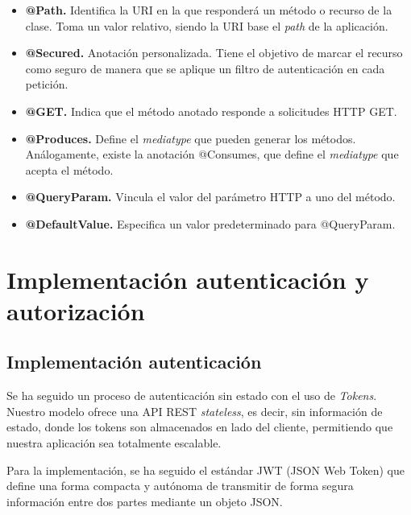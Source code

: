 \begin{itemize}
	\item \textbf{@Path. }Identifica la URI en la que responderá un método o recurso de la clase. Toma un valor relativo, siendo la URI base el \textit{path} de la aplicación.
	\item \textbf{@Secured. }Anotación personalizada. Tiene el objetivo de marcar el recurso como seguro de manera que se aplique un filtro de autenticación en cada petición.
	\item \textbf{@GET. }Indica que el método anotado responde a solicitudes HTTP GET.
	\item \textbf{@Produces. }Define el \textit{mediatype} que pueden generar los métodos. Análogamente, existe la anotación @Consumes, que define el \textit{mediatype} que acepta el método.
	\item \textbf{@QueryParam. }Vincula el valor del parámetro HTTP a uno del método.
	\item \textbf{@DefaultValue. }Especifica un valor predeterminado para @QueryParam.
\end{itemize}


\section{Implementación autenticación y autorización}

\subsection{Implementación autenticación}

Se ha seguido un proceso de autenticación sin estado con el uso de \textit{Tokens}. Nuestro modelo ofrece una API REST \textit{stateless}, es decir, sin información de estado, donde los tokens son almacenados en lado del cliente, permitiendo que nuestra aplicación sea totalmente escalable.

Para la implementación, se ha seguido el estándar JWT (JSON Web Token) que define una forma compacta y autónoma de transmitir de forma segura información entre dos partes mediante un objeto JSON.


